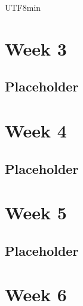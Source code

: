 \documentclass[11pt]{article}
\begin{document}
\begin{CJK}{UTF8}{min}

\newpage
\section{Week 3}

\subsection{Placeholder}


\newpage
\section{Week 4}

\subsection{Placeholder}


\newpage
\section{Week 5}

\subsection{Placeholder}


\newpage
\section{Week 6}


\end{CJK}
\end{document}
